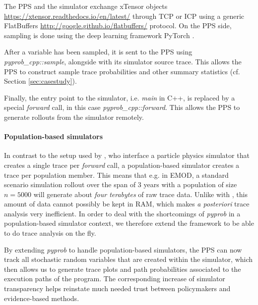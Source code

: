 \documentclass{article}
\begin{document}



The PPS and the simulator exchange xTensor objects \url{https://xtensor.readthedocs.io/en/latest/} through TCP or ICP using a generic FlatBuffers \url{http://google.github.io/flatbuffers/} protocol. On the PPS side, sampling is done using the deep learning framework PyTorch \cite{paszke2017automatic}.

After a variable has been sampled, it is sent to the PPS using \textit{pyprob\_cpp::sample}, alongside with its simulator source trace. This allows the PPS to construct sample trace probabilities and other summary statistics (cf. Section \ref{sec:casestudy}). 

Finally, the entry point to the simulator, i.e. \textit{main} in C++, is replaced by a special \textit{forward} call, in this case \textit{pyprob\_cpp::forward}.
This allows the PPS to generate rollouts from the simulator remotely. 

\paragraph{Population-based simulators} In contrast to the setup used by \cite{baydin2018efficient}, who interface a particle physics simulator that creates a single trace per \textit{forward} call, a population-based simulator creates a trace per population member. This means that e.g. in EMOD, a standard scenario simulation rollout over the span of $3$ years  
with a population of size $n=5000$ \cite{smith2008towards} will generate about \textit{four terabytes} of raw trace data. Unlike with \citep{baydin2018efficient}, this amount of data cannot possibly be kept in RAM, which makes \textit{a posteriori} trace analysis very inefficient. 
In order to deal with the shortcomings of \textit{pyprob} in a population-based simulator context, we therefore extend the framework to be able to do trace analysis on the fly.

By extending \textit{pyprob} to handle population-based simulators, the PPS can now track all stochastic random variables that are created within the simulator, which then allows us to generate trace plots and path probabilities associated to the execution paths of the program.
The corresponding increase of simulator transparency helps reinstate much needed trust between policymakers and evidence-based methods.
\end{document}
